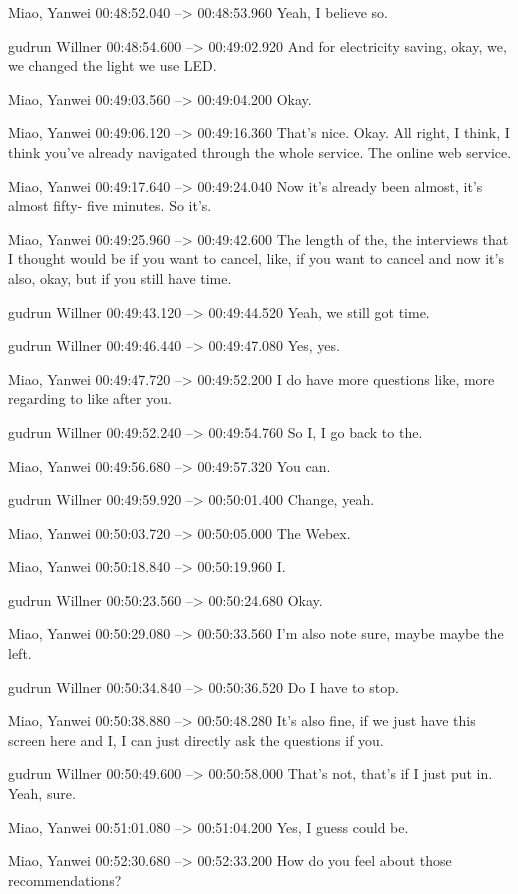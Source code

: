 {Miao, Yanwei 00:48:52.040 --> 00:48:53.960
Yeah, I believe so.

gudrun Willner 00:48:54.600 --> 00:49:02.920
And for electricity saving, okay, we, we changed the light we use LED.

Miao, Yanwei 00:49:03.560 --> 00:49:04.200
Okay.

Miao, Yanwei 00:49:06.120 --> 00:49:16.360
That's nice. Okay. All right, I think, I think you've already navigated through the whole service. The online web service.

Miao, Yanwei 00:49:17.640 --> 00:49:24.040
Now it's already been almost, it's almost fifty- five minutes. So it's.

Miao, Yanwei 00:49:25.960 --> 00:49:42.600
The length of the, the interviews that I thought would be if you want to cancel, like, if you want to cancel and now it's also, okay, but if you still have time.

gudrun Willner 00:49:43.120 --> 00:49:44.520
Yeah, we still got time.

gudrun Willner 00:49:46.440 --> 00:49:47.080
Yes, yes.

Miao, Yanwei 00:49:47.720 --> 00:49:52.200
I do have more questions like, more regarding to like after you.

gudrun Willner 00:49:52.240 --> 00:49:54.760
So I, I go back to the.

Miao, Yanwei 00:49:56.680 --> 00:49:57.320
You can.

gudrun Willner 00:49:59.920 --> 00:50:01.400
Change, yeah.

Miao, Yanwei 00:50:03.720 --> 00:50:05.000
The Webex.

Miao, Yanwei 00:50:18.840 --> 00:50:19.960
I.

gudrun Willner 00:50:23.560 --> 00:50:24.680
Okay.

Miao, Yanwei 00:50:29.080 --> 00:50:33.560
I'm also note sure, maybe maybe the left.

gudrun Willner 00:50:34.840 --> 00:50:36.520
Do I have to stop.

Miao, Yanwei 00:50:38.880 --> 00:50:48.280
It's also fine, if we just have this screen here and I, I can just directly ask the questions if you.

gudrun Willner 00:50:49.600 --> 00:50:58.000
That's not, that's if I just put in. Yeah, sure.

Miao, Yanwei 00:51:01.080 --> 00:51:04.200
Yes, I guess could be.

Miao, Yanwei 00:52:30.680 --> 00:52:33.200
How do you feel about those recommendations?

}
